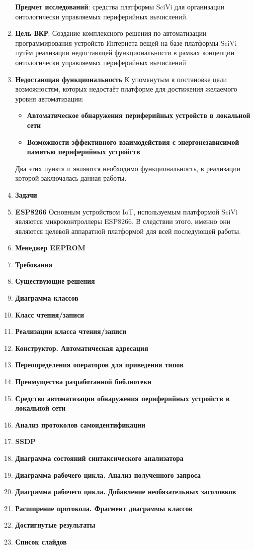 \begin{enumerate}
	\textbf{Предмет исследований}: средства платформы SciVi для организации онтологически управляемых периферийных вычислений.
	\item \textbf{Цель ВКР}:
	Создание комплексного решения по  автоматизации программирования устройств Интернета вещей на базе платформы SciVi путём реализации недостающей функциональности в рамках концепции онтологически управляемых периферийных вычислений
	\item \textbf{Недостающая функциональность}
	К упомянутым в постановке цели возможностям, которых недостаёт платформе для достижения желаемого уровня автоматизации:
	\begin{itemize}
		\item \textbf{Автоматическое обнаружения периферийных устройств в локальной сети}
		\item \textbf{Возможности эффективного взаимодействия с энергонезависимой памятью периферийных устройств}
	\end{itemize}
	Два этих пункта и являются необходимо функциональность, в реализации которой заключалась данная работы.
	\item \textbf{Задачи}
	\item \textbf{ESP8266}
	Основным устройством IoT, используемым платформой SciVi являются микроконтроллеры ESP8266. В следствии этого, именно они являются целевой аппаратной платформой для всей последующей работы.
	\item \textbf{Менеджер EEPROM}
	\item \textbf{Требования}
	\item \textbf{Существующие решения}
	\item \textbf{Диаграмма классов}
	\item \textbf{Класс чтения/записи}
	\item \textbf{Реализации класса чтения/записи}
	\item \textbf{Конструктор. Автоматическая адресация}
	\item \textbf{Переопределения операторов для приведения типов}
	\item \textbf{Преимущества разработанной библиотеки}
	\item \textbf{Средство автоматизации обнаружения периферийных устройств в локальной сети}
	\item \textbf{Анализ протоколов самоидентификации}
	\item \textbf{SSDP}
	\item \textbf{Диаграмма состояний синтаксического анализатора}
	\item \textbf{Диаграмма рабочего цикла. Анализ полученного запроса}
	\item \textbf{Диаграмма рабочего цикла. Добавление необязательных заголовков}
	\item \textbf{Расширение протокола. Фрагмент диаграммы классов}
	\item \textbf{Достигнутые результаты}
	\item \textbf{Список слайдов}
\end{enumerate}
